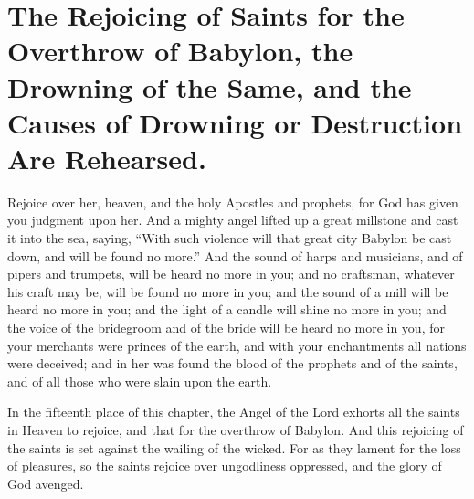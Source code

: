 \chapter[Sermon 80. The Rejoicing of Saints for the Overthrow of Babylon, the Drowning of the Same, and the Causes of Drowning or Destruction Are Rehearsed.]{The Rejoicing of Saints for the Overthrow of Babylon, the Drowning of the Same, and the Causes of Drowning or Destruction Are Rehearsed.}
\label{sermon:080}

Rejoice over her, heaven, and the holy Apostles and prophets, for God has given you judgment upon her. And a mighty angel lifted up a great millstone and cast it into the sea, saying, “With such violence will that great city Babylon be cast down, and will be found no more.” And the sound of harps and musicians, and of pipers and trumpets, will be heard no more in you; and no craftsman, whatever his craft may be, will be found no more in you; and the sound of a mill will be heard no more in you; and the light of a candle will shine no more in you; and the voice of the bridegroom and of the bride will be heard no more in you, for your merchants were princes of the earth, and with your enchantments all nations were deceived; and in her was found the blood of the prophets and of the saints, and of all those who were slain upon the earth.

In the fifteenth place of this chapter, the Angel of the Lord exhorts all the saints in Heaven to rejoice, and that for the overthrow of Babylon. And this rejoicing of the saints is set against the wailing of the wicked. For as they lament for the loss of pleasures, so the saints rejoice over ungodliness oppressed, and the glory of God avenged.

